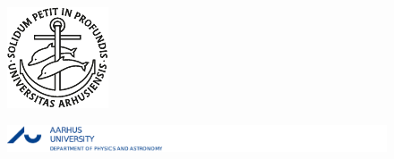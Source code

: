 	\pagestyle{empty}
	\newpage
	\phantom{blabla}
	\clearpage
	\begin{figure}[t]
		\centering
		\includegraphics[width=3cm]{figures/logo.pdf}
	\end{figure}
	\vspace{1cm}
	\noindent
	
	\begin{figure}[b]
		\includegraphics[scale=1.5]{figures/AU_DPA.pdf}
	\end{figure}